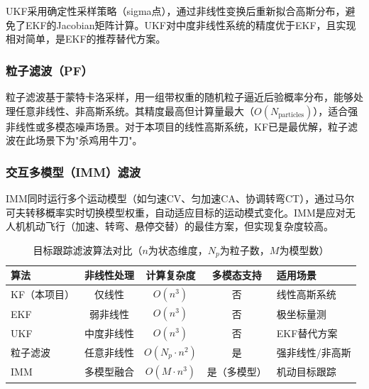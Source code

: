 \documentclass[12pt, a4paper]{article}
\begin{document}
UKF\cite{ref_ukf}采用确定性采样策略（sigma点），通过非线性变换后重新拟合高斯分布，避免了EKF的Jacobian矩阵计算。UKF对中度非线性系统的精度优于EKF，且实现相对简单，是EKF的推荐替代方案。

\subsubsection{粒子滤波（PF）}

粒子滤波\cite{ref_pf}基于蒙特卡洛采样，用一组带权重的随机粒子逼近后验概率分布，能够处理任意非线性、非高斯系统。其精度最高但计算量最大（$O(N_{\text{particles}})$），适合强非线性或多模态噪声场景。对于本项目的线性高斯系统，KF已是最优解，粒子滤波在此场景下为"杀鸡用牛刀"。

\subsubsection{交互多模型（IMM）滤波}

IMM\cite{ref_imm}同时运行多个运动模型（如匀速CV、匀加速CA、协调转弯CT），通过马尔可夫转移概率实时切换模型权重，自动适应目标的运动模式变化。IMM是应对无人机机动飞行（加速、转弯、悬停交替）的最佳方案，但实现复杂度较高。

\begin{table}[H]
\centering
\begin{tabularx}{\textwidth}{lCCCL}
\toprule
{}\color{white}\bfseries 算法 &
  \color{white}\bfseries 非线性处理 &
  \color{white}\bfseries 计算复杂度 &
  \color{white}\bfseries 多模态支持 &
  \color{white}\bfseries 适用场景 \\
\midrule
KF（本项目） & 仅线性 & $O(n^3)$ & 否 & 线性高斯系统 \\
EKF & 弱非线性 & $O(n^3)$ & 否 & 极坐标量测 \\
UKF & 中度非线性 & $O(n^3)$ & 否 & EKF替代方案 \\
粒子滤波 & 任意非线性 & $O(N_p \cdot n^2)$ & 是 & 强非线性/非高斯 \\
IMM & 多模型融合 & $O(M \cdot n^3)$ & 是（多模型） & 机动目标跟踪 \\
\bottomrule
\end{tabularx}
\caption{目标跟踪滤波算法对比（$n$为状态维度，$N_p$为粒子数，$M$为模型数）}
\label{tab:tracking_comparison}
\end{table}
\end{document}
